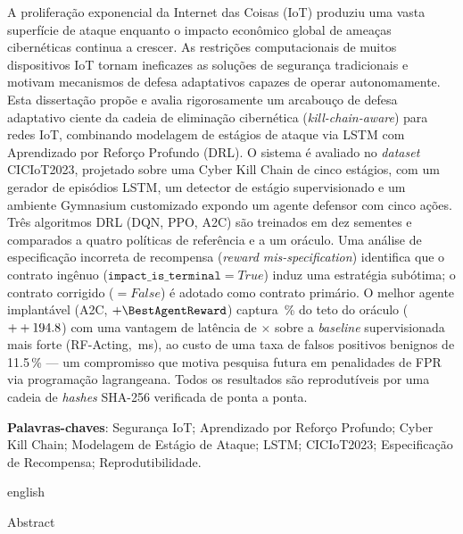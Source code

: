 \begin{resumo}
A proliferação exponencial da Internet das Coisas (IoT) produziu uma vasta
superfície de ataque enquanto o impacto econômico global de ameaças cibernéticas
continua a crescer. As restrições computacionais de muitos dispositivos IoT
tornam ineficazes as soluções de segurança tradicionais e motivam mecanismos de
defesa adaptativos capazes de operar autonomamente. Esta dissertação propõe e
avalia rigorosamente um arcabouço de defesa adaptativo ciente da cadeia de
eliminação cibernética (\emph{kill-chain-aware}) para redes IoT, combinando
modelagem de estágios de ataque via LSTM com Aprendizado por Reforço Profundo
(DRL). O sistema é avaliado no \emph{dataset} CICIoT2023, projetado sobre uma
Cyber Kill Chain de cinco estágios, com um gerador de episódios LSTM, um
detector de estágio supervisionado e um ambiente Gymnasium customizado expondo
um agente defensor com cinco ações. Três algoritmos DRL (DQN, PPO, A2C) são
treinados em dez sementes e comparados a quatro políticas de referência e a um
oráculo. Uma análise de especificação incorreta de recompensa (\emph{reward
mis-specification}) identifica que o contrato ingênuo ($\texttt{impact\_is\_terminal}
=\mathit{True}$) induz uma estratégia subótima; o contrato corrigido
($=\mathit{False}$) é adotado como contrato primário. O melhor agente implantável
(A2C, $+\BestAgentReward$) captura \OracleCapturePct\,\% do teto do oráculo
($++194.8$) com uma vantagem de latência de \LatencyRatio$\times$ sobre
a \emph{baseline} supervisionada mais forte (RF-Acting, \RFLatency\,ms), ao custo
de uma taxa de falsos positivos benignos de 11.5\,\% --- um compromisso que
motiva pesquisa futura em penalidades de FPR via programação lagrangeana. Todos
os resultados são reprodutíveis por uma cadeia de \emph{hashes} SHA-256
verificada de ponta a ponta.

    \vspace{\onelineskip}

    \noindent\textbf{Palavras-chaves}: Segurança IoT; Aprendizado por Reforço Profundo;
    Cyber Kill Chain; Modelagem de Estágio de Ataque; LSTM; CICIoT2023;
    Especificação de Recompensa; Reprodutibilidade.

    \vspace{\onelineskip}
    \vspace{\onelineskip}

    \begin{otherlanguage*}{english}
    \begin{center}{\ABNTEXchapterfont\huge Abstract}\end{center}


\end{otherlanguage*}
\end{resumo}
